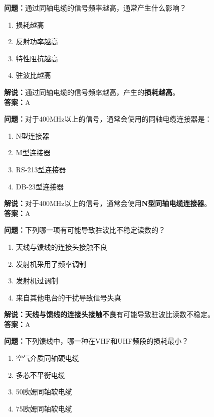 \textbf{问题：}通过同轴电缆的信号频率越高，通常产生什么影响？

\begin{enumerate}[label=\Alph*), leftmargin=1cm]
	\item 损耗越高
	\item 反射功率越高
	\item 特性阻抗越高
	\item 驻波比越高
\end{enumerate}

\textbf{解说：}通过同轴电缆的信号频率越高，产生的\textbf{损耗越高}。\\\textbf{答案：}A%



\textbf{问题：}对于400MHz以上的信号，通常会使用的同轴电缆连接器是：

\begin{enumerate}[label=\Alph*), leftmargin=1cm]
	\item N型连接器
	\item M型连接器
	\item RS-213型连接器
	\item DB-23型连接器
\end{enumerate}

\textbf{解说：}对于400MHz以上的信号，通常会使用\textbf{N型同轴电缆连接器}。\\\textbf{答案：}A%



\textbf{问题：}下列哪一项有可能导致驻波比不稳定读数的？

\begin{enumerate}[label=\Alph*), leftmargin=1cm]
	\item 天线与馈线的连接头接触不良
	\item 发射机采用了频率调制
	\item 发射机过调制
	\item 来自其他电台的干扰导致信号失真
\end{enumerate}

\textbf{解说：}\textbf{天线与馈线的连接头接触不良}有可能导致驻波比读数不稳定。\\\textbf{答案：}A%



\textbf{问题：}下列馈线中，哪一种在VHF和UHF频段的损耗最小？

\begin{enumerate}[label=\Alph*), leftmargin=1cm]
	\item 空气介质同轴硬电缆
	\item 多芯不平衡电缆
	\item 50欧姆同轴软电缆
	\item 75欧姆同轴软电缆
\end{enumerate}

